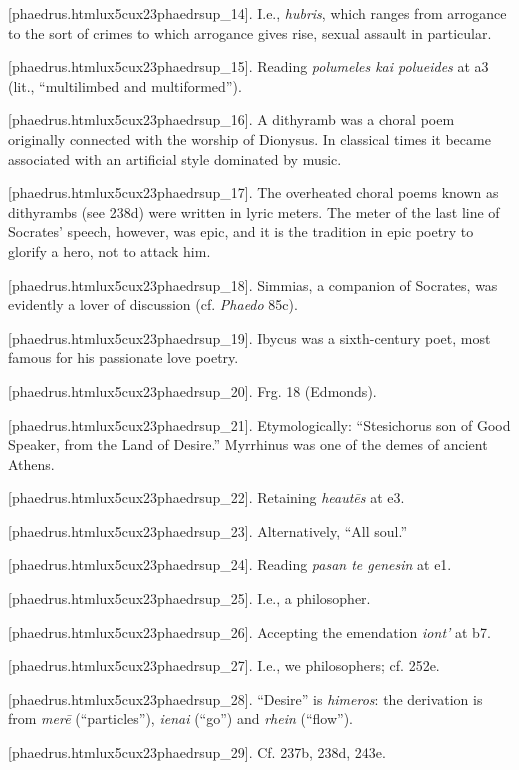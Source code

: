 [phaedrus.htmlux5cux23phaedrsup_14]. I.e., {\em hubris}, which
ranges from arrogance to the sort of crimes to which arrogance gives
rise, sexual assault in particular.

[phaedrus.htmlux5cux23phaedrsup_15]. Reading {\em polumeles kai
polueides} at a3 (lit., “multilimbed and multiformed”).

[phaedrus.htmlux5cux23phaedrsup_16]. A dithyramb was a choral
poem originally connected with the worship of Dionysus. In classical
times it became associated with an artificial style dominated by music.

[phaedrus.htmlux5cux23phaedrsup_17]. The overheated choral
poems known as dithyrambs (see 238d) were written in lyric meters. The
meter of the last line of Socrates' speech, however, was epic, and it is
the tradition in epic poetry to glorify a hero, not to attack him.

[phaedrus.htmlux5cux23phaedrsup_18]. Simmias, a companion of
Socrates, was evidently a lover of discussion (cf. {\em Phaedo} 85c).

[phaedrus.htmlux5cux23phaedrsup_19]. Ibycus was a sixth-century
poet, most famous for his passionate love poetry.

[phaedrus.htmlux5cux23phaedrsup_20]. Frg. 18 (Edmonds).

[phaedrus.htmlux5cux23phaedrsup_21]. Etymologically:
“Stesichorus son of Good Speaker, from the Land of Desire.” Myrrhinus
was one of the demes of ancient Athens.

[phaedrus.htmlux5cux23phaedrsup_22]. Retaining {\em heautēs} at
e3.

[phaedrus.htmlux5cux23phaedrsup_23]. Alternatively, “All soul.”

[phaedrus.htmlux5cux23phaedrsup_24]. Reading {\em pasan te
genesin} at e1.

[phaedrus.htmlux5cux23phaedrsup_25]. I.e., a philosopher.

[phaedrus.htmlux5cux23phaedrsup_26]. Accepting the emendation
{\em iont'} at b7.

[phaedrus.htmlux5cux23phaedrsup_27]. I.e., we philosophers; cf.
252e.

[phaedrus.htmlux5cux23phaedrsup_28]. “Desire” is {\em himeros}:
the derivation is from {\em merē} (“particles”), {\em ienai} (“go”) and
{\em rhein} (“flow”).

[phaedrus.htmlux5cux23phaedrsup_29]. Cf. 237b, 238d, 243e.

